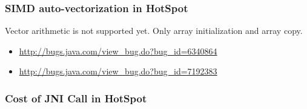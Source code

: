\documentclass{beamer}
\begin{document}
  	\begin{frame}
  		\frametitle{SIMD auto-vectorization in HotSpot}
		Vector arithmetic is not supported yet. Only array initialization and array copy.
  		\begin{itemize}
  			\item \url{http://bugs.java.com/view_bug.do?bug_id=6340864}
  			\item \url{http://bugs.java.com/view_bug.do?bug_id=7192383}
  		\end{itemize}
  	\end{frame}
  	\begin{frame}
  		\frametitle{Cost of JNI Call	in HotSpot}
  	\end{frame}
\end{document}
